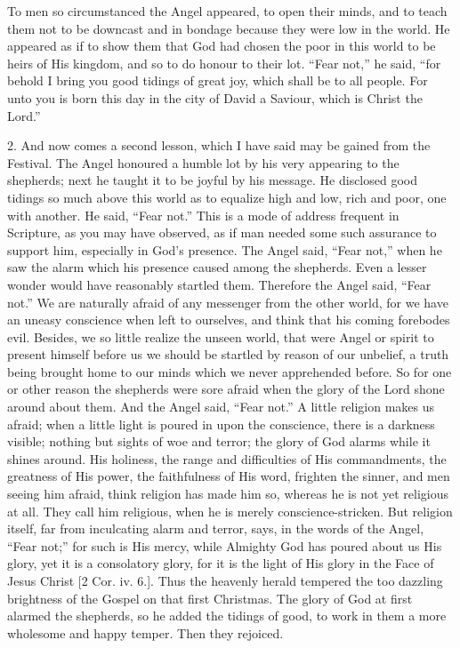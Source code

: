 To men so circumstanced the Angel appeared, to open their minds,
and to teach them not to be downcast and in bondage because they were
low in the world. He appeared as if to show them that God had chosen
the poor in this world to be heirs of His kingdom, and so to do honour
to their lot. ``Fear not,'' he said, ``for behold I bring
you good tidings of great joy, which shall be to all people. For unto
you is born this day in the city of David a Saviour, which is Christ
the Lord.''

2. And now comes a second lesson, which I have said may be gained
from the Festival. The Angel honoured a humble lot by his very
appearing to the shepherds; next he taught it to be joyful by his
message. He disclosed good tidings so much above this world as to
equalize high and low, rich and poor, one with another. He said,
``Fear not.'' This is a mode of address frequent in Scripture,
as you may have observed, as if man needed some such assurance to
support him, especially in God's presence. The Angel said, ``Fear
not,'' when he saw the alarm which his presence caused among the
shepherds. Even a lesser wonder would have reasonably startled them.
Therefore the Angel said, ``Fear not.'' We are naturally
afraid of any messenger from the other world, for we have an uneasy
conscience when left to ourselves, and think that his coming forebodes
evil. Besides, we so little realize the unseen world, that were Angel
or spirit to present himself before us we should be startled by reason
of our unbelief, a truth being brought home to our minds which we
never apprehended before. So for one or other reason the shepherds
were sore afraid when the glory of the Lord shone around about them.
And the Angel said, ``Fear not.'' A little religion makes us
afraid; when a little light is poured in upon the conscience, there is
a darkness visible; nothing but sights of woe and terror; the glory of
God alarms while it shines around. His holiness, the range and
difficulties of His commandments, the greatness of His power, the
faithfulness of His word, frighten the sinner, and men seeing him
afraid, think religion has made him so, whereas he is not yet
religious at all. They call him religious, when he is merely
conscience-stricken. But religion itself, far from inculcating alarm
and terror, says, in the words of the Angel, ``Fear not;'' for
such is His mercy, while Almighty God has poured about us His glory,
yet it is a consolatory glory, for it is the light of His glory in the
Face of Jesus Christ [2 Cor. iv. 6.]. Thus the heavenly herald
tempered the too dazzling brightness of the Gospel on that first
Christmas. The glory of God at first alarmed the shepherds, so he
added the tidings of good, to work in them a more wholesome and happy
temper. Then they rejoiced.

